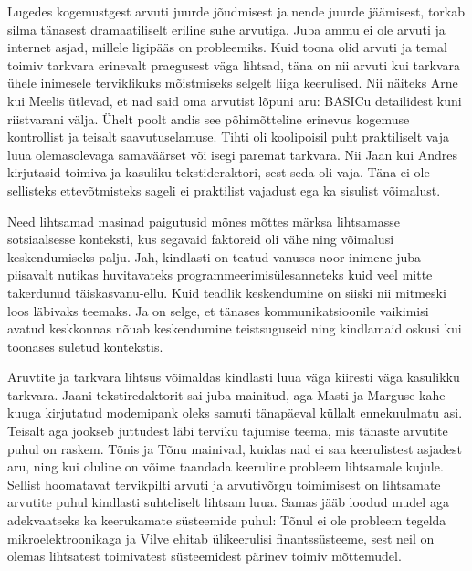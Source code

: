Lugedes kogemustgest arvuti juurde jõudmisest ja nende juurde jäämisest, torkab 
silma tänasest dramaatiliselt eriline suhe arvutiga. Juba ammu ei ole arvuti ja 
internet asjad, millele ligipääs on probleemiks. Kuid toona olid arvuti ja 
temal toimiv tarkvara erinevalt praegusest väga lihtsad, täna on nii arvuti kui 
tarkvara ühele inimesele terviklikuks mõistmiseks selgelt liiga keerulised. Nii 
näiteks Arne kui Meelis ütlevad, et nad said oma arvutist lõpuni aru: BASICu 
detailidest kuni riistvarani välja. Ühelt poolt andis see põhimõtteline 
erinevus kogemuse kontrollist ja teisalt saavutuselamuse. Tihti oli koolipoisil 
puht praktiliselt vaja luua olemasolevaga samaväärset või isegi paremat 
tarkvara. Nii Jaan kui Andres kirjutasid  toimiva ja kasuliku 
tekstideraktori, sest seda oli vaja. Täna ei ole sellisteks 
ettevõtmisteks sageli ei praktilist vajadust ega ka sisulist võimalust.

Need lihtsamad masinad paigutusid mõnes mõttes märksa lihtsamasse sotsiaalsesse 
konteksti, kus segavaid faktoreid oli vähe ning võimalusi keskendumiseks palju. 
Jah, kindlasti on teatud vanuses noor inimene juba piisavalt nutikas 
huvitavateks programmeerimisülesanneteks kuid veel mitte takerdunud 
täiskasvanu-ellu. Kuid teadlik keskendumine on siiski nii mitmeski loos 
läbivaks teemaks. Ja on selge, et tänases kommunikatsioonile vaikimisi avatud 
keskkonnas nõuab keskendumine teistsuguseid ning kindlamaid oskusi kui toonases 
suletud kontekstis. 

Aruvtite ja tarkvara lihtsus võimaldas kindlasti luua väga kiiresti väga 
kasulikku tarkvara. Jaani tekstiredaktorit sai juba mainitud, aga Masti ja 
Marguse kahe kuuga kirjutatud modemipank oleks samuti tänapäeval küllalt 
ennekuulmatu asi. Teisalt aga jookseb juttudest läbi terviku tajumise teema, 
mis tänaste arvutite puhul on raskem. Tõnis ja Tõnu mainivad, kuidas nad ei saa 
keerulistest asjadest aru, ning kui oluline on võime taandada keeruline 
probleem lihtsamale kujule. Sellist hoomatavat tervikpilti arvuti ja 
arvutivõrgu toimimisest on lihtsamate arvutite puhul kindlasti suhteliselt 
lihtsam luua. Samas jääb loodud mudel aga adekvaatseks ka keerukamate 
süsteemide puhul: Tõnul ei ole probleem tegelda mikroelektroonikaga ja Vilve 
ehitab ülikeerulisi finantssüsteeme, sest neil on olemas lihtsatest toimivatest 
süsteemidest pärinev toimiv mõttemudel.

